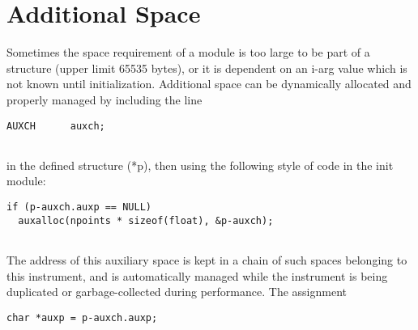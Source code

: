 \begin{comment}
\documentclass[10pt]{article}
\usepackage{fullpage, graphicx, url}
\setlength{\parskip}{1ex}
\setlength{\parindent}{0ex}
\title{Additional Space}



\begin{tabular}{ccc}
The Alternative Csound Reference Manual & & \\
Previous &Adding your own Cmodules to Csound &Next

\end{tabular}

\end{comment}
\section{Additional Space}


  Sometimes the space requirement of a module is too large to be part of a structure (upper limit 65535 bytes), or it is dependent on an i-arg value which is not known until initialization. Additional space can be dynamically allocated and properly managed by including the line 


 
\begin{lstlisting}
AUXCH      auxch;
        
\end{lstlisting}


 


  in the defined structure (*p), then using the following style of code in the init module: 


 
\begin{lstlisting}
if (p-auxch.auxp == NULL)
  auxalloc(npoints * sizeof(float), &p-auxch);
        
\end{lstlisting}


 


  The address of this auxiliary space is kept in a chain of such spaces belonging to this instrument, and is automatically managed while the instrument is being duplicated or garbage-collected during performance. The assignment 


 
\begin{lstlisting}
char *auxp = p-auxch.auxp;
        
\end{lstlisting}


